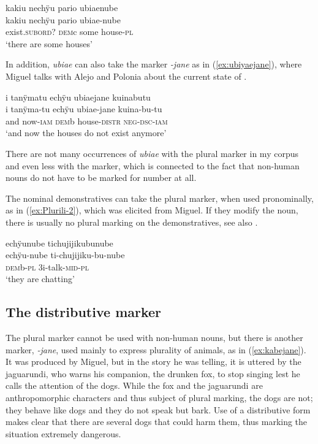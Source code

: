 \ea\label{ex:ubiyaenube}
\begingl 
\glpreamble kakiu nechÿu pario ubiaenube\\
\gla kakiu nechÿu pario ubiae-nube\\ 
\glb exist.\textsc{subord}? \textsc{dem}c some house-\textsc{pl}\\ 
\glft ‘there are some houses’\\ 
\endgl
\trailingcitation{[mqx-p110826l.182]}%
\xe

In addition, \textit{ubiae} can also take the  marker \textit{-jane} as in (\ref{ex:ubiyaejane}), where Miguel talks with Alejo and Polonia about the current state of .

\ea\label{ex:ubiyaejane}
\begingl 
\glpreamble i tanÿmatu echÿu ubiaejane kuinabutu\\
\gla i tanÿma-tu echÿu ubiae-jane kuina-bu-tu\\ 
\glb and now-\textsc{iam} \textsc{dem}b house-\textsc{distr} \textsc{neg}-\textsc{dsc}-\textsc{iam}\\ 
\glft ‘and now the houses do not exist anymore’\\ 
\endgl
\trailingcitation{[mty-p110906l.200-201]}
\xe

There are not many occurrences of \textit{ubiae} with the plural marker in my corpus and even less with the  marker, which is connected to the fact that non-human nouns do not have to be marked for number at all. 

The nominal demonstratives can take the plural marker, when used pronominally, as in (\ref{ex:Plurili-2}), which was elicited from Miguel. If they modify the noun, there is usually no plural marking on the demonstratives, see also .

\ea\label{ex:Plurili-2}
\begingl
\glpreamble echÿunube tichujijikubunube\\
\gla echÿu-nube ti-chujijiku-bu-nube\\
\glb \textsc{dem}b-\textsc{pl} 3i-talk-\textsc{mid}-\textsc{pl}\\
\glft ‘they are chatting’
\endgl
\trailingcitation{[mrx-e150219s.011]}
\xe
{}

\subsection{The distributive marker}\label{sec:NounPL-jane}

The plural marker cannot be used with non-human nouns, but there is another marker, \textit{-jane}, used mainly to express plurality of animals, as in (\ref{ex:kabejane}). It was produced by Miguel, but in the story he was telling, it is uttered by the jaguarundi, who warns his companion, the drunken fox, to stop singing lest he calls the attention of the dogs. While the fox and the jaguarundi are anthropomorphic characters and thus subject of plural marking, the dogs are not; they behave like dogs and they do not speak but bark. Use of a distributive form makes clear that there are several dogs that could harm them, thus marking the situation extremely dangerous.

